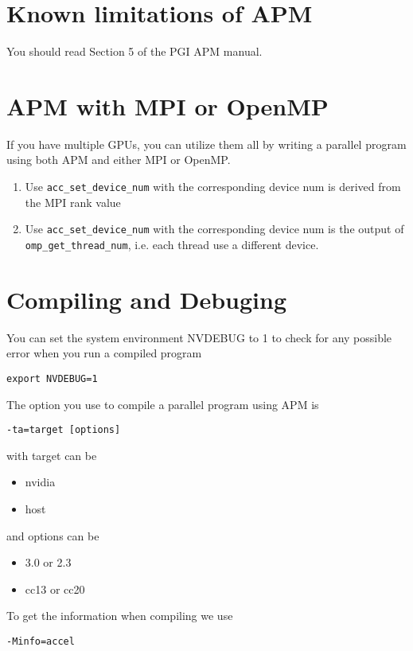 \section{Known limitations of APM}
\label{sec:known-limit-apm}

You should read Section 5 of the PGI APM manual. 

\section{APM with MPI or OpenMP}
\label{sec:apm-with-mpi}

If you have multiple GPUs, you can utilize them all by writing a
parallel program using both APM and either MPI or OpenMP.
\begin{enumerate}
\item Use \verb!acc_set_device_num! with the corresponding device num
  is derived from the MPI rank value
\item Use \verb!acc_set_device_num! with the corresponding device num
  is the output of \verb!omp_get_thread_num!, i.e. each thread use a
  different device.
\end{enumerate}

\section{Compiling and Debuging}
\label{sec:compiling-debuging}

You can set the system environment NVDEBUG to 1 to check for any
possible error when you run a compiled program
\begin{lstlisting}
export NVDEBUG=1
\end{lstlisting}

The option you use to compile a parallel program using APM is 
\begin{verbatim}
-ta=target [options]
\end{verbatim}
with target can be
\begin{itemize}
\item nvidia
\item host
\end{itemize}
and options can be
\begin{itemize}
\item 3.0 or 2.3 
\item cc13 or cc20
\end{itemize}

To get the information when compiling we use
\begin{verbatim}
-Minfo=accel
\end{verbatim}

